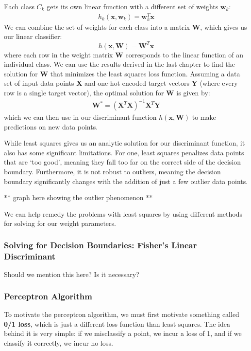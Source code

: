 Each class $C_{k}$ gets its own linear function with a different set of weights $\textbf{w}_{k}$:
\begin{align*}
	h_{k}(\textbf{x}, \textbf{w}_{k}) = \textbf{w}_{k}^{T}\textbf{x}
\end{align*}
We can combine the set of weights for each class into a matrix $\textbf{W}$, which gives us our linear classifier:
\begin{equation}
	h(\textbf{x}, \textbf{W}) = \textbf{W}^{T}\textbf{x}
\end{equation}
where each row in the weight matrix \textbf{W} corresponds to the linear function of an individual class. We can use the results derived in the last chapter to find the solution for \textbf{W} that minimizes the least squares loss function. Assuming a data set of input data points \textbf{X} and one-hot encoded target vectors \textbf{Y} (where every row is a single target vector), the optimal solution for \textbf{W} is given by:
\begin{align*}
	\textbf{W}^{*} = (\textbf{X}^{T}\textbf{X})^{-1}\textbf{X}^{T}\textbf{Y}
\end{align*}
which we can then use in our discriminant function $h(\textbf{x}, \textbf{W})$ to make predictions on new data points.

While least squares gives us an analytic solution for our discriminant function, it also has some significant limitations. For one, least squares penalizes data points that are `too good', meaning they fall too far on the correct side of the decision boundary. Furthermore, it is not robust to outliers, meaning the decision boundary significantly changes with the addition of just a few outlier data points.

** graph here showing the outlier phenomenon **

We can help remedy the problems with least squares by using different methods for solving for our weight parameters.

\subsubsection{Solving for Decision Boundaries: Fisher's Linear Discriminant}
Should we mention this here? Is it necessary?

\subsubsection{Perceptron Algorithm}
To motivate the perceptron algorithm, we must first motivate something called \textbf{0/1 loss}, which is just a different loss function than least squares. The idea behind it is very simple: if we misclassify a point, we incur a loss of 1, and if we classify it correctly, we incur no loss.

